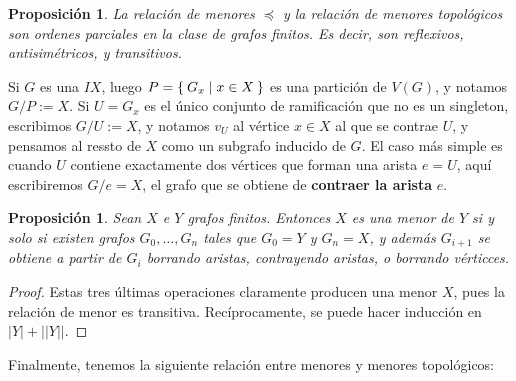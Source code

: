 \documentclass[12pt]{report}
\theoremstyle{plain}
\newtheorem{proposition}[theorem]{Proposición}
\theoremstyle{definition}
\newcommand{\abs}[1]{\left \vert #1 \right \vert}
\newcommand{\Abs}[1]{\left \vert \left \vert #1 \right \vert \right \vert}
\begin{document}
\begin{proposition}
La relación de menores $\preccurlyeq$ y la relación de menores topológicos son ordenes parciales en la clase de grafos finitos. Es decir, son reflexivos, antisimétricos, y transitivos.
\end{proposition}


Si $G$ es una $IX$, luego $P = \Set{G_x | x \in X}$ es una partición de $V(G)$, y notamos $G/P := X$. Si $U = G_x$ es el único conjunto de ramificación que no es un singleton, escribimos $G/U := X$, y notamos $v_U$ al vértice $x \in X$ al que se contrae $U$, y pensamos al ressto de $X$ como un subgrafo inducido de $G$. El caso más simple es cuando $U$ contiene exactamente dos vértices que forman una arista $e= U$, aquí escribiremos $G/e = X$, el grafo que se obtiene de \textbf{contraer la arista} $e$.

\begin{proposition}
Sean $X$ e $Y$ grafos finitos. Entonces $X$ es una menor de $Y$ si y solo si existen grafos $G_0,\ldots,G_n$ tales que $G_0 = Y$ y $G_n = X$, y además $G_{i+1}$ se obtiene a partir de $G_i$ borrando aristas, contrayendo aristas, o borrando vérticces.
\end{proposition}
\begin{proof}
Estas tres últimas operaciones claramente producen una menor $X$, pues la relación de menor es transitiva. Recíprocamente, se puede hacer inducción en $\abs Y + \Abs Y$.
\end{proof}

Finalmente, tenemos la siguiente relación entre menores y menores topológicos:
\end{document}
